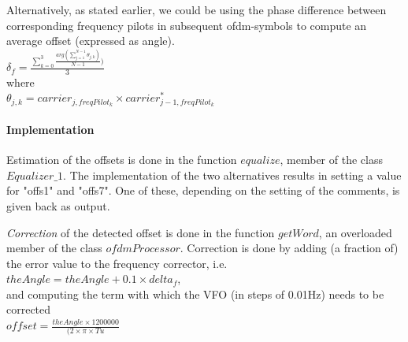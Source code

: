 \documentclass[11pt]{article}
\begin{document}
Alternatively, as stated earlier, we could be using the
phase difference between
corresponding frequency pilots in subsequent ofdm-symbols to
compute an average
offset (expressed as angle).
{
\ \\
$\delta_f = \frac{\sum_{k=0}^{3} \frac{arg (\sum_{j=1}^{N - 1} \theta_{j, k})}{N - 1})}{3}$
\ \\
}
where
{
\ \\
$\theta_{j, k} = carrier_{j, freqPilot_k} \times carrier_{j - 1, freqPilot_k}^* $
\ \\
}

\paragraph{Implementation}
Estimation of the offsets is done in the function $equalize$, member of the
class $Equalizer\_1$. The implementation of the two alternatives
results in setting a value for "offs1" and "offs7". One of these,
depending on the setting of the comments, is given back as output.

{\em Correction} of the detected offset is done in the function $getWord$,
an overloaded member of the class $ofdmProcessor$.
Correction is done by adding (a fraction of) the error value
to the frequency corrector, i.e.
{
\ \\
$theAngle = theAngle + 0.1 \times delta_f$,
\ \\
}
and computing the term with which the VFO (in steps of 0.01Hz) needs to
be corrected
{
\ \\
$offset = \frac{theAngle \times 1200000}{(2 \times \pi \times Tu}$ 
\ \\
}
\end{document}

